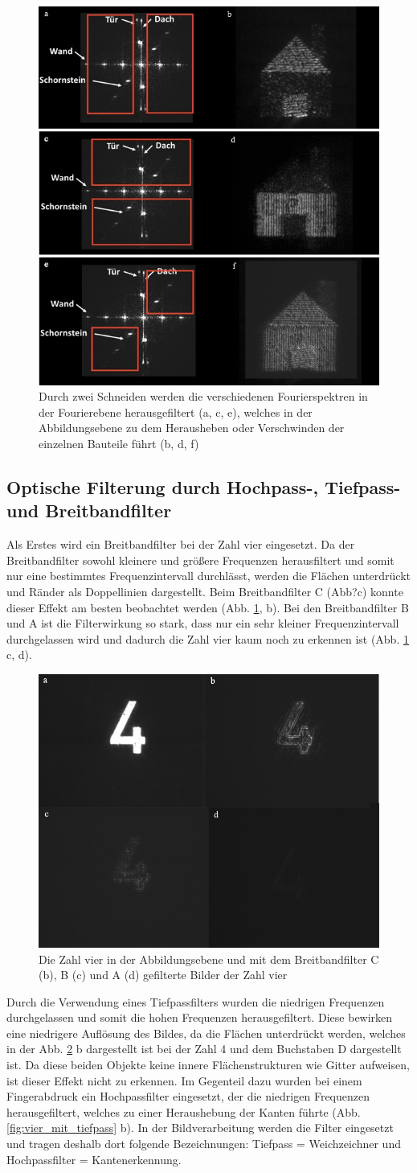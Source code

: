 \begin{figure}[h]
	\centering
	\includegraphics[width=0.10\linewidth]{Regina/abb21}
	\caption[Abbildung Fourierhaus mit Filtern]{Durch zwei Schneiden werden die verschiedenen Fourierspektren in der Fourierebene herausgefiltert (a, c, e), welches in der   Abbildungsebene zu dem Herausheben oder Verschwinden der einzelnen Bauteile führt (b, d, f)}
	\label{fig:fourierhaus_mit_filtern}
\end{figure}

\subsection{Optische Filterung durch Hochpass-, Tiefpass- und Breitbandfilter}

Als Erstes wird ein Breitbandfilter bei der Zahl vier eingesetzt. Da der Breitbandfilter sowohl kleinere und größere Frequenzen herausfiltert und somit nur eine bestimmtes Frequenzintervall durchlässt, werden die Flächen unterdrückt und Ränder als Doppellinien dargestellt. Beim Breitbandfilter C (Abb?c) konnte dieser Effekt am besten beobachtet werden (Abb. \ref{fig:fourierhaus_mit_filtern}, b). Bei den Breitbandfilter B und A ist die Filterwirkung so stark, dass nur
ein sehr kleiner Frequenzintervall durchgelassen wird und dadurch die Zahl vier kaum noch zu erkennen ist (Abb. \ref{fig:fourierhaus_mit_filtern} c, d).

\begin{figure}[h]
	\centering
	\includegraphics[width=0.10\linewidth]{Regina/abb22}
	\caption[Zahl 4 mit Breitbandfiltern]{Die Zahl vier in  der Abbildungsebene und mit dem Breitbandfilter C (b), B (c) 
	und A (d) gefilterte Bilder der Zahl vier}
	\label{fig:vier_mit_breitband}
\end{figure}

Durch die Verwendung eines Tiefpassfilters wurden die niedrigen Frequenzen durchgelassen und somit die hohen Frequenzen herausgefiltert. Diese bewirken eine niedrigere Auflösung des
Bildes, da die Flächen unterdrückt werden, welches in der Abb. \ref{fig:vier_mit_breitband} b dargestellt ist bei der Zahl 4 und dem Buchstaben D dargestellt ist. Da diese beiden Objekte keine innere Flächenstrukturen wie Gitter aufweisen, ist dieser Effekt nicht zu erkennen.
Im Gegenteil dazu wurden bei einem Fingerabdruck ein Hochpassfilter eingesetzt, der die niedrigen Frequenzen herausgefiltert, welches zu einer Heraushebung der Kanten führte (Abb. \ref{fig:vier_mit_tiefpass} b). In der Bildverarbeitung werden die Filter eingesetzt und tragen deshalb dort folgende Bezeichnungen: Tiefpass = Weichzeichner und Hochpassfilter = Kantenerkennung.

